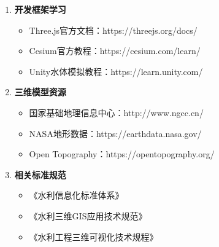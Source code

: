 \begin{enumerate}
\def\labelenumi{\arabic{enumi}.}
\tightlist
\item
  \textbf{开发框架学习}

  \begin{itemize}
  \tightlist
  \item
    Three.js官方文档：https://threejs.org/docs/
  \item
    Cesium官方教程：https://cesium.com/learn/
  \item
    Unity水体模拟教程：https://learn.unity.com/
  \end{itemize}
\item
  \textbf{三维模型资源}

  \begin{itemize}
  \tightlist
  \item
    国家基础地理信息中心：http://www.ngcc.cn/
  \item
    NASA地形数据：https://earthdata.nasa.gov/
  \item
    Open Topography：https://opentopography.org/
  \end{itemize}
\item
  \textbf{相关标准规范}

  \begin{itemize}
  \tightlist
  \item
    《水利信息化标准体系》
  \item
    《水利三维GIS应用技术规范》
  \item
    《水利工程三维可视化技术规程》
  \end{itemize}
\end{enumerate}
